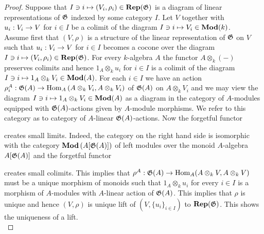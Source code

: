 \begin{proof}
Suppose that $I\ni i\mapsto (V_i,\rho_i)\in \mathbf{Rep}({\mathfrak G})$ is a diagram of linear representations of ${\mathfrak G}$ indexed by some category $I$. Let $V$ together with $u_i:V_i\rightarrow V$ for $i\in I$ be a colimit of the diagram $I\ni i\mapsto V_i\in \mathbf{Mod}(k)$.\\
Assume first that $(V,\rho)$ is a structure of the linear representation of ${\mathfrak G}$ on $V$ such that $u_i:V_i\rightarrow V$ for $i\in I$ becomes a cocone over the diagram $I\ni i\mapsto (V_i,\rho_i)\in \mathbf{Rep}({\mathfrak G})$. For every $k$-algebra $A$ the functor $A\otimes_k(-)$ preserves colimits and hence $1_A\otimes_ku_i$ for $i\in I$ is a colimit of the diagram $I\ni i \mapsto 1_A\otimes_kV_i\in \mathbf{Mod}(A)$. For each $i\in I$ we have an action $\rho_i^A:{\mathfrak G}(A)\rightarrow \mathrm{Hom}_A\left(A\otimes_kV_i, A\otimes_kV_i\right)$ of ${\mathfrak G}(A)$ on $A\otimes_kV_i$ and we may view the diagram $I\ni i \mapsto 1_A\otimes_kV_i\in \mathbf{Mod}(A)$ as a diagram in the category of $A$-modules equipped with ${\mathfrak G}(A)$-actions given by $A$-module morphisms. We refer to this category as to category of $A$-linear ${\mathfrak G}(A)$-actions. Now the forgetful functor
\begin{center}
\end{center}
creates small limits. Indeed, the category on the right hand side is isomorphic with the category $\mathbf{Mod}\left(A[{\mathfrak G}(A)]\right)$ of left modules over the monoid $A$-algebra $A[{\mathfrak G}(A)]$ and the forgetful functor
\begin{center}
\end{center}
creates small colimits. This implies that $\rho^A:{\mathfrak G}(A) \rightarrow \mathrm{Hom}_A(A\otimes_kV,A\otimes_kV)$ must be a unique morphism of monoids such that $1_A\otimes_ku_i$ for every $i\in I$ is a morphism of $A$-modules with $A$-linear action of ${\mathfrak G}(A)$. This implies that $\rho$ is unique and hence $(V,\rho)$ is unique lift of $\left(V,\{u_i\}_{i\in I}\right)$ to $\mathbf{Rep}({\mathfrak G})$. This shows the uniqueness of a lift.\\

\end{proof}
